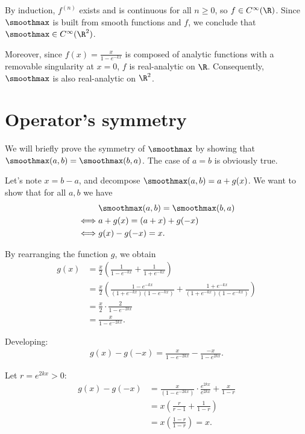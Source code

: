 By induction, $f^{(n)}$ exists and is continuous for all $n \geq 0$, so $f \in C^\infty(\R)$. Since $\smoothmax$ is built from smooth functions and $f$, we conclude that $\smoothmax \in C^\infty(\R^2)$.

\smallConclusion

Moreover, since $f(x) = \frac{x}{1 - e^{-kx}}$ is composed of analytic functions with a removable singularity at $x = 0$, $f$ is real-analytic on $\R$. Consequently, $\smoothmax$ is also real-analytic on $\R^2$.

\section{Operator's symmetry}
We will briefly prove the symmetry of $\smoothmax$ by showing that $\smoothmax(a, b) = \smoothmax(b, a)$. The case of $a = b$ is obviously true.

Let's note $x = b - a$, and decompose $\smoothmax(a, b) = a + g(x)$. We want to show that for all $a, b$ we have
\begin{align}
    & \smoothmax(a, b) = \smoothmax(b, a) \\
    \iff& a + g(x) = (a + x) + g(-x) \\
    \iff& g(x) - g(-x) = x.
\end{align}

By rearranging the function $g$, we obtain 
\begin{align}
    g(x) &= \frac{x}{2} \left( \frac{1}{1 - e^{-kx}} + \frac{1}{1 + e^{-kx}} \right) \\
    &= \frac{x}{2} \left( \frac{1 - e^{-kx}}{(1 + e^{-kx})(1 - e^{-kx})} + \frac{1 + e^{-kx}}{(1 + e^{-kx})(1 - e^{-kx})} \right) \\
    &= \frac{x}{2} \cdot \frac{2}{1 - e^{-2kx}} \\
    &= \frac{x}{1 - e^{-2kx}}.
\end{align}


Developing:
\begin{align}
    g(x) - g(-x) = \frac{x}{1 - e^{-2kx}} - \frac{-x}{1 - e^{2kx}}.
\end{align}

Let $r = e^{2kx} > 0$:
\begin{align}
    g(x) - g(-x) &= \frac{x}{(1 - e^{-2kx})} \cdot \frac{e^{2kx}}{e^{2kx}} + \frac{x}{1 - r} \\
    &= x \left( \frac{r}{r - 1} + \frac{1}{1 - r} \right) \\
    &= x \left( \frac{1 - r}{1 - r} \right) = x.
\end{align}

